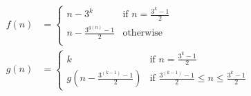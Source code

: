 \documentclass{article}
\begin{document}
\thispagestyle{empty}



\begin{align*}
  f(n) &= \begin{cases}
    n- 3^k &\mbox{if } n = \frac{3^k - 1}{2} \\
    n - \frac{3^{g(n)} - 1}{2} & \mbox{otherwise}\\
  \end{cases}\\
  g(n) &= \begin{cases}
    k &\mbox{if } n = \frac{3^k - 1}{2} \\
    g(n - \frac{3^{(k - 1)} - 1}{2}) & \mbox{if } \frac{3^{(k - 1)} - 1}{2} \leq n \leq \frac{3^k - 1}{2}
  \end{cases}\\
\end{align*}
\end{document}
